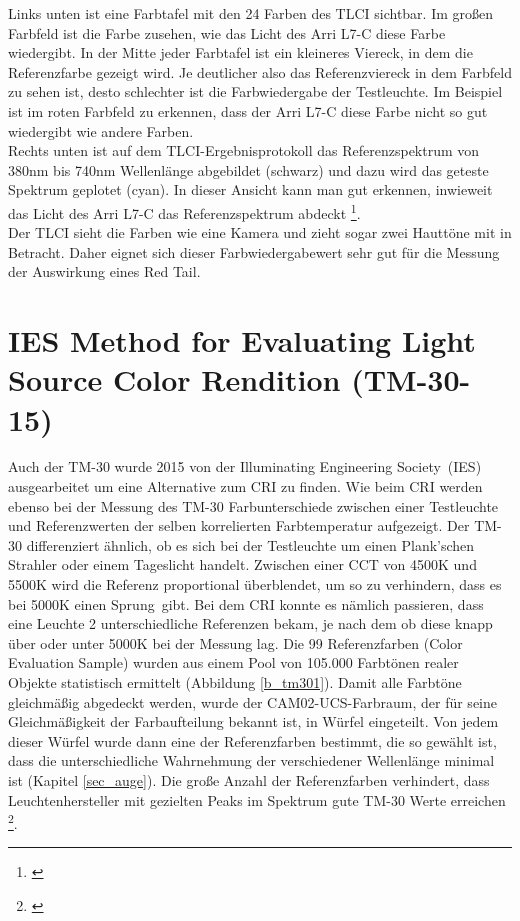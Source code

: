 Links unten ist eine Farbtafel mit den 24 Farben des TLCI sichtbar. Im großen Farbfeld ist die Farbe zusehen, wie das Licht des Arri L7-C diese Farbe wiedergibt. In der Mitte jeder Farbtafel ist ein kleineres Viereck, in dem die Referenzfarbe gezeigt wird. Je deutlicher also das Referenzviereck in dem Farbfeld zu sehen ist, desto schlechter ist die Farbwiedergabe der Testleuchte. Im Beispiel  ist im roten Farbfeld zu erkennen, dass der Arri L7-C diese Farbe nicht so gut wiedergibt wie andere Farben.\\ 
Rechts unten ist auf dem TLCI-Ergebnisprotokoll das Referenzspektrum von 380nm bis 740nm Wellenlänge abgebildet (schwarz) und dazu wird das geteste Spektrum geplotet (cyan). In dieser Ansicht kann man gut erkennen, inwieweit das Licht des Arri L7-C das Referenzspektrum abdeckt \footnote{\cite[15]{roberts}}.\\

Der TLCI sieht die Farben wie eine Kamera und zieht sogar zwei Hauttöne mit in Betracht. Daher eignet sich dieser Farbwiedergabewert sehr gut für die Messung der Auswirkung eines Red Tail.  



\section{IES Method for Evaluating Light Source Color Rendition (TM-30-15)} \label{sec_tm30}

Auch der TM-30 wurde 2015 von der \glqq Illuminating Engineering Society\grqq\ (IES) ausgearbeitet um eine Alternative zum CRI zu finden. Wie beim CRI werden ebenso bei der Messung des TM-30 Farbunterschiede zwischen einer Testleuchte und Referenzwerten der selben korrelierten Farbtemperatur aufgezeigt. Der TM-30 differenziert ähnlich, ob es sich bei der Testleuchte um einen Plank'schen Strahler  oder einem Tageslicht handelt. Zwischen einer CCT von 4500K und 5500K wird die Referenz proportional überblendet, um so zu verhindern, dass es bei 5000K einen \glqq Sprung\grqq\ gibt. Bei dem CRI konnte es nämlich passieren, dass eine Leuchte 2 unterschiedliche Referenzen bekam, je nach dem ob diese knapp über oder unter 5000K bei der Messung lag. 
Die 99 Referenzfarben (Color Evaluation Sample) wurden aus einem Pool von 105.000 Farbtönen realer Objekte statistisch ermittelt (Abbildung \ref{b_tm301}). Damit alle Farbtöne gleichmäßig abgedeckt werden, wurde der CAM02-UCS-Farbraum, der für seine Gleichmäßigkeit der Farbaufteilung bekannt ist, in Würfel eingeteilt. Von jedem dieser Würfel wurde dann eine der Referenzfarben bestimmt, die so gewählt ist, dass die unterschiedliche Wahrnehmung der verschiedener Wellenlänge minimal ist (Kapitel \ref{sec_auge}). Die große Anzahl der Referenzfarben verhindert, dass Leuchtenhersteller mit gezielten Peaks im Spektrum gute TM-30 Werte erreichen \footnote{\cite{usdep}}.
\newpage

